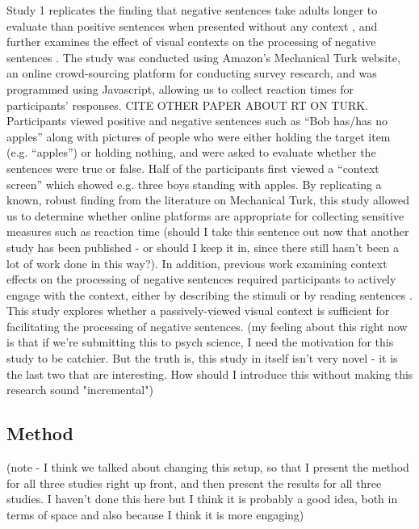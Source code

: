 \documentclass[man]{apa2}
\begin{document}
Study 1 replicates the finding that negative sentences take adults longer to evaluate than positive sentences when presented without any context \cite{hclark1972, carpenter1975, just1971, just1976}, and further examines the effect of visual contexts on the processing of negative sentences \cite{wason1965}.  The study was conducted using Amazon's Mechanical Turk website, an online crowd-sourcing platform for conducting survey research, and was programmed using Javascript, allowing us to collect reaction times for participants' responses.  CITE OTHER PAPER ABOUT RT ON TURK.  Participants viewed positive and negative sentences such as ``Bob has/has no apples'' along with pictures of people who were either holding the target item (e.g. ``apples'') or holding nothing, and were asked to evaluate whether the sentences were true or false.  Half of the participants first viewed a ``context screen'' which showed e.g. three boys standing with apples.  By replicating a known, robust finding from the literature on Mechanical Turk, this study allowed us to determine whether online platforms are appropriate for collecting sensitive measures such as reaction time (should I take this sentence out now that another study has been published - or should I keep it in, since there still hasn't been a lot of work done in this way?).  In addition, previous work examining context effects on the processing of negative sentences required participants to actively engage with the context, either by describing the stimuli \cite{wason1965} or by reading sentences \cite{dale2011, glenberg1999, ludtke2006}.  This study explores whether a passively-viewed visual context is sufficient for facilitating the processing of negative sentences.  (my feeling about this right now is that if we're submitting this to psych science, I need the motivation for this study to be catchier.  But the truth is, this study in itself isn't very novel - it is the last two that are interesting.  How should I introduce this without making this research sound "incremental")

\subsection{Method}

(note - I think we talked about changing this setup, so that I present the method for all three studies right up front, and then present the results for all three studies.  I haven't done this here but I think it is probably a good idea, both in terms of space and also because I think it is more engaging)
\end{document}
